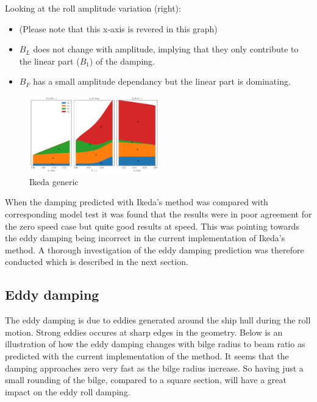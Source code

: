 Looking at the roll amplitude variation (right):

\begin{itemize}
\item (Please note that this x-axis is revered in this graph)
\item $B_L$ does not change with amplitude, implying that they only contribute to the linear part ($B_1$) of the damping.
\item $B_F$ has a small amplitude dependancy but the linear part is dominating.
\end{itemize}

    

    
    \begin{figure}[H]
        \begin{center}\includegraphics[width = 0.5\textwidth]{figures/ikeda_generic.pdf}\end{center}
        \vspace{-1cm}
        \caption{Ikeda generic}
        \label{fig:ikeda_generic}
    \end{figure}
    
    When the damping predicted with Ikeda's method was compared with
corresponding model test it was found that the results were in poor
agreement for the zero speed case but quite good results at speed. This
was pointing towards the eddy damping being incorrect in the current
implementation of Ikeda's method. A thorough investigation of the eddy
damping prediction was therefore conducted which is described in the
next section.

    \subsection*{Eddy damping}\label{eddy-damping}

The eddy damping is due to eddies generated around the ship hull during
the roll motion. Strong eddies occures at sharp edges in the geometry.
Below is an illustration of how the eddy damping changes with bilge
radius to beam ratio as predicted with the current implementation of the
method. It seems that the damping approaches zero very fast as the bilge
radius increase. So having just a small rounding of the bilge, compared
to a square section, will have a great impact on the eddy roll damping.

